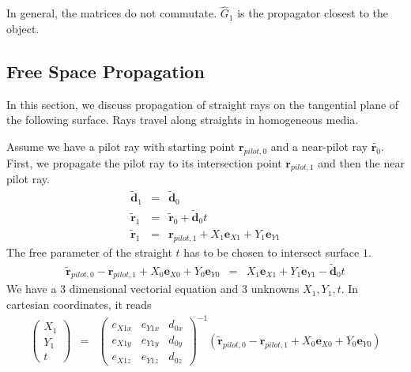 \documentclass[12pt,a4paper,twoside,openright,BCOR10mm,headsepline,titlepage,abstracton,chapterprefix,final]{scrreprt}
\newcommand\Vector[1]{{\mathbf{#1}}}
\begin{document}
In general, the matrices do not commutate. $\hat{G}_1$ is the propagator closest to the object.


\subsection{Free Space Propagation}
In this section, we discuss propagation of straight rays on the tangential plane of the following surface.
Rays travel along straights in homogeneous media.

Assume we have a pilot ray with starting point $\Vector{r}_{pilot,0}$ and a near-pilot ray $\tilde{\Vector{r}_0}$.
First, we propagate the pilot ray to its intersection point $\Vector{r}_{pilot,1}$ and then the near pilot ray.
\begin{eqnarray}
 \tilde{\Vector{d}}_1 &=& \tilde{\Vector{d}}_0 \\
 \tilde{\Vector{r}}_1 &=& \tilde{\Vector{r}}_0 + \tilde{\Vector{d}}_0 t \\
 \tilde{\Vector{r}}_1 &=& \Vector{r}_{pilot,1} + X_1 \Vector{e}_{X1} + Y_1 \Vector{e}_{Y1}
\end{eqnarray}
The free parameter of the straight $t$ has to be chosen to intersect surface $1$.
\begin{eqnarray}
 \tilde{\Vector{r}}_{pilot,0} - \Vector{r}_{pilot,1} + X_0 \Vector{e}_{X0} + Y_0 \Vector{e}_{Y0} 
 &=& 
 X_1 \Vector{e}_{X1} + Y_1 \Vector{e}_{Y1} - \tilde{\Vector{d}}_0 t
\end{eqnarray}
We have a 3 dimensional vectorial equation and 3 unknowns $X_1, Y_1, t$.
In cartesian coordinates, it reads
\begin{eqnarray}
 \begin{pmatrix}
  X_1 \\ Y_1 \\ t
 \end{pmatrix}
 &=&
 \begin{pmatrix}
  e_{X1x} & e_{Y1x} & d_{0x} \\
  e_{X1y} & e_{Y1y} & d_{0y} \\
  e_{X1z} & e_{Y1z} & d_{0z}
 \end{pmatrix}^{-1}
 \left(
  \tilde{\Vector{r}}_{pilot,0} - \Vector{r}_{pilot,1} + X_0 \Vector{e}_{X0} + Y_0 \Vector{e}_{Y0} 
 \right)
\end{eqnarray}
\end{document}
